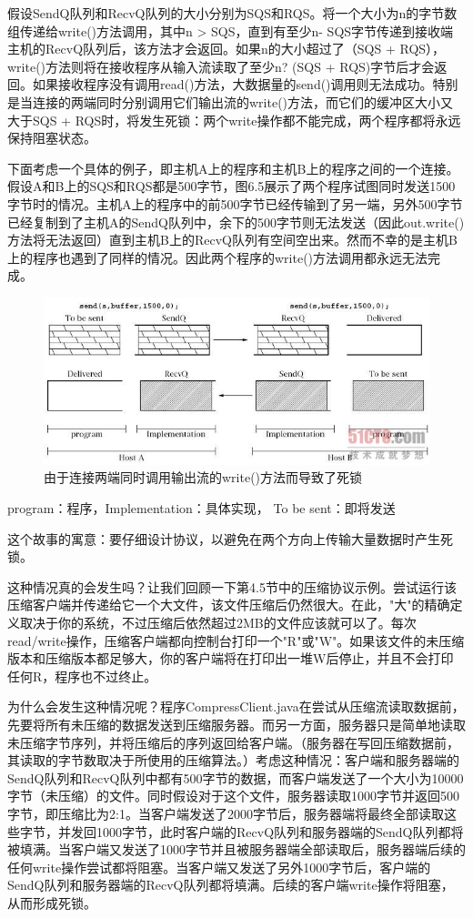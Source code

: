 	假设SendQ队列和RecvQ队列的大小分别为SQS和RQS。将一个大小为n的字节数组传递给write()方法调用，其中n > SQS，直到有至少n- SQS字节传递到接收端主机的RecvQ队列后，该方法才会返回。如果n的大小超过了（SQS + RQS），write()方法则将在接收程序从输入流读取了至少n? (SQS + RQS)字节后才会返回。如果接收程序没有调用read()方法，大数据量的send()调用则无法成功。特别是当连接的两端同时分别调用它们输出流的write()方法，而它们的缓冲区大小又大于SQS + RQS时，将发生死锁：两个write操作都不能完成，两个程序都将永远保持阻塞状态。

	下面考虑一个具体的例子，即主机A上的程序和主机B上的程序之间的一个连接。假设A和B上的SQS和RQS都是500字节，图6.5展示了两个程序试图同时发送1500字节时的情况。主机A上的程序中的前500字节已经传输到了另一端，另外500字节已经复制到了主机A的SendQ队列中，余下的500字节则无法发送（因此out.write()方法将无法返回）直到主机B上的RecvQ队列有空间空出来。然而不幸的是主机B上的程序也遇到了同样的情况。因此两个程序的write()方法调用都永远无法完成。

	\begin{figure}[htbp]%
		\centering
		\includegraphics[scale=.6]{img/06.05.jpg}
		\caption{由于连接两端同时调用输出流的write()方法而导致了死锁}
		\label{fig:dead.lock.by.call.both.side}
	\end{figure}

	program：程序，Implementation：具体实现， To be sent：即将发送

	这个故事的寓意：要仔细设计协议，以避免在两个方向上传输大量数据时产生死锁。

	这种情况真的会发生吗？让我们回顾一下第4.5节中的压缩协议示例。尝试运行该压缩客户端并传递给它一个大文件，该文件压缩后仍然很大。在此，"大"的精确定义取决于你的系统，不过压缩后依然超过2MB的文件应该就可以了。每次read/write操作，压缩客户端都向控制台打印一个"R"或"W"。如果该文件的未压缩版本和压缩版本都足够大，你的客户端将在打印出一堆W后停止，并且不会打印任何R，程序也不过终止。

	为什么会发生这种情况呢？程序CompressClient.java在尝试从压缩流读取数据前，先要将所有未压缩的数据发送到压缩服务器。而另一方面，服务器只是简单地读取未压缩字节序列，并将压缩后的序列返回给客户端。（服务器在写回压缩数据前，其读取的字节数取决于所使用的压缩算法。）考虑这种情况：客户端和服务器端的SendQ队列和RecvQ队列中都有500字节的数据，而客户端发送了一个大小为10000字节（未压缩）的文件。同时假设对于这个文件，服务器读取1000字节并返回500字节，即压缩比为2:1。当客户端发送了2000字节后，服务器端将最终全部读取这些字节，并发回1000字节，此时客户端的RecvQ队列和服务器端的SendQ队列都将被填满。当客户端又发送了1000字节并且被服务器端全部读取后，服务器端后续的任何write操作尝试都将阻塞。当客户端又发送了另外1000字节后，客户端的SendQ队列和服务器端的RecvQ队列都将填满。后续的客户端write操作将阻塞，从而形成死锁。

